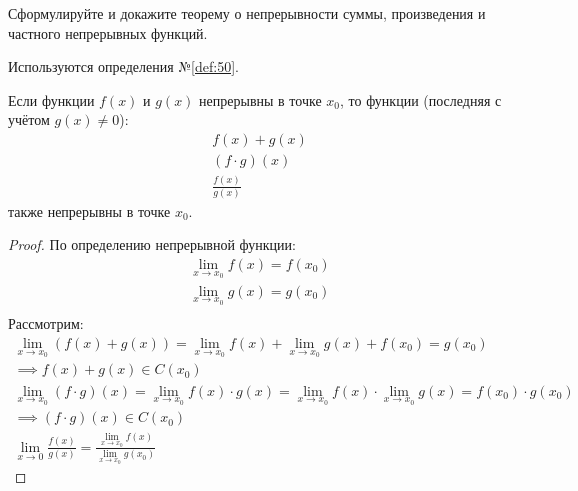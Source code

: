 \begin{question}
    Сформулируйте и докажите теорему о непрерывности суммы, произведения и частного непрерывных функций.
\end{question}
\begin{used}
    Используются определения №\ref{def:50}.
\end{used}
\begin{theorem}
  Если функции $f(x)$ и $g(x)$ непрерывны в точке $x_0$, то функции (последняя с учётом $g(x) \neq 0$):   
  \begin{gather*}
    f(x) + g(x) \\
    (f \cdot g)(x) \\
    \frac{f(x)}{g(x)}
  \end{gather*}
  также непрерывны в точке $x_0$. 
\end{theorem}
\begin{proof}
    По определению непрерывной функции: 
    \begin{gather*}
        \lim_{x \to x_0} f(x) = f(x_0) \\
        \lim_{x \to x_0} g(x) = g(x_0) \\
    \end{gather*}
    Рассмотрим:
    \begin{gather*}
        \lim_{x \to x_0} (f(x) + g(x)) = \lim_{x \to x_0} f(x) + \lim_{x \to x_0} g(x) + f(x_0) = g(x_0) \\
        \implies f(x) + g(x) \in C(x_0) 
        \\
        \lim_{x \to x_0} (f \cdot g)(x) = \lim_{x \to x_0} f(x) \cdot g(x) = \lim_{x \to x_0} f(x) \cdot \lim_{x \to x_0} g(x) = f(x_0) \cdot g(x_0) 
        \\
        \implies (f \cdot g)(x) \in C(x_0)
        \\
        \lim_{x \to 0} \frac{f(x)}{g(x)} = \frac{\lim_{x \to x_0} f(x)}{\lim_{x \to x_0} g(x_0)}
    \end{gather*}
\end{proof}
\pagebreak



